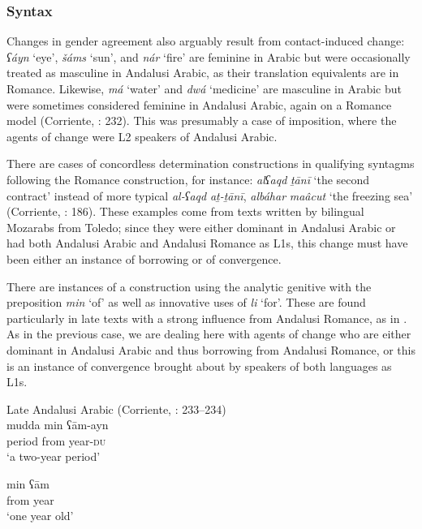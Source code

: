 \documentclass[output=paper,modfonts,nonflat]{langsci/langscibook}
\begin{document}
\subsubsection{Syntax}




Changes in gender agreement also arguably result from contact-induced change: \textit{ʕáyn} ‘eye’, \textit{šáms} ‘sun’, and \textit{nár} ‘fire’ are feminine in Arabic but were occasionally treated as masculine in Andalusi Arabic, as their translation equivalents are in Romance. Likewise, \textit{má} ‘water’ and \textit{dwá} ‘medicine’ are masculine in Arabic but were sometimes considered feminine in Andalusi Arabic, again on a Romance model (Corriente, \citealt{PereiraVicente2015}: 232). This was presumably a case of imposition, where the agents of change were L2 speakers of Andalusi Arabic. 

There are cases of concordless determination constructions in qualifying syntagms following the Romance construction, for instance: \textit{alʕaqd} \textit{ṯānī} ‘the second contract’ instead of more typical \textit{al-ʕaqd} \textit{aṯ-ṯānī}, \textit{albáhar} \textit{maâcut} ‘the freezing sea’ (Corriente, \citealt{PereiraVicente2015}: 186). These examples come from texts written by bilingual Mozarabs from Toledo; since they were either dominant in Andalusi Arabic or had both Andalusi Arabic and Andalusi Romance as L1s, this change must have been either an instance of borrowing or of convergence. 

There are instances of a construction using the analytic genitive with the preposition \textit{min} ‘of’ as well as innovative uses of \textit{li} ‘for’. These are found particularly in late texts with a strong influence from Andalusi Romance, as in \citep{Corriente2012}. As in the previous case, we are dealing here with agents of change who are either dominant in Andalusi Arabic and thus borrowing from Andalusi Romance, or this is an instance of convergence brought about by speakers of both languages as L1s.


\ea\label{bkm:Ref13069050}
Late Andalusi Arabic (Corriente, \citealt{PereiraVicente2015}: 233–234)\\
\ea \gll mudda min ʕām-ayn\\
     period from year-\textsc{du}\\
\glt ‘a two-year period’



\ex\label{ex:key:}
\gll min ʕām\\
     from year\\
\glt ‘one year old’
\end{document}
